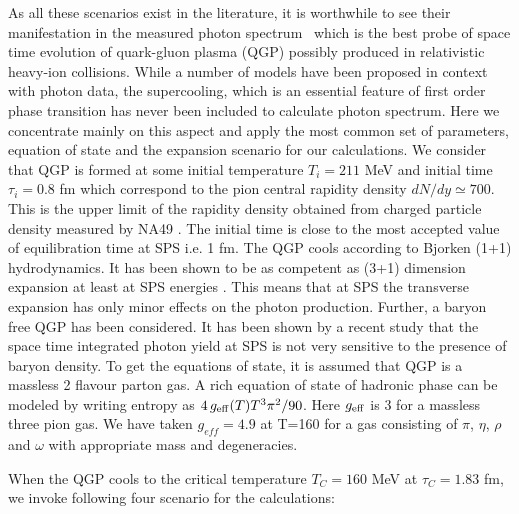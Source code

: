   As all these scenarios exist in the literature, it is worthwhile 
to see their manifestation in the measured photon spectrum~\cite{WA98}
which is the best probe of space time evolution of 
quark-gluon plasma (QGP) possibly produced in relativistic heavy-ion
collisions. While a number of models have been proposed in context 
with photon data, the supercooling, which is an essential feature of 
first order phase transition has never been included to calculate photon 
spectrum. Here we concentrate mainly on this aspect and 
apply the most common set of parameters, equation of state 
and the expansion scenario for our calculations.
  We consider that QGP is formed at some initial temperature 
$T_i=211$ MeV and initial time $\tau_i=0.8$ fm which correspond to
the pion central rapidity density $dN/dy \simeq 700$. This is the upper 
limit of the rapidity density obtained from charged particle 
density measured by NA49 \cite{NA49}. The initial time is close to the most 
accepted value of equilibration time at SPS i.e. 1 fm. 
The QGP cools according to Bjorken (1+1) hydrodynamics. It has been
shown to be as competent as (3+1) dimension expansion at least at SPS
energies \cite{THOMA,STEFF}. This means that at SPS the transverse 
expansion has only minor effects on the photon production.
 Further, a baryon free QGP has been considered. It has been shown 
by a recent study \cite{DIPA} that the space time integrated photon 
yield at SPS is not very sensitive to the presence of baryon density.
  To get the equations of state, it is assumed that QGP is a massless 
2 flavour parton gas. A rich equation of state of hadronic phase can 
be modeled by writing entropy as $4\, g_{\rm eff}(T) T^3 \pi^2/90$.
Here $g_{\rm eff}$ is 3 for a massless three pion gas. We have 
taken $g_{eff}=4.9$ at T=160 \cite{SOM} for a gas consisting 
of $\pi$, $\eta$, $\rho$ and $\omega$ with appropriate mass and 
degeneracies.

 When the QGP cools to the critical temperature $T_C=160$ MeV at 
$\tau_C=1.83$ fm, we invoke following four scenario for the calculations:

